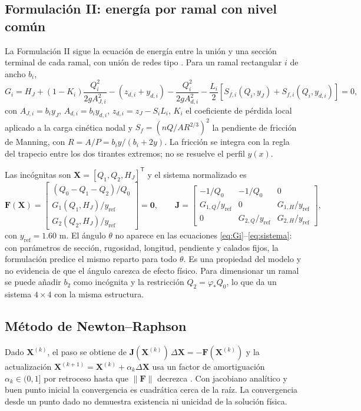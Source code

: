 \subsection{Formulación II: energía por ramal con nivel común}\label{sec:f2}
La Formulación II sigue la ecuación de energía entre la unión y una sección terminal de cada ramal, con unión de redes tipo \citet[cap.~6]{chaudhry2008}. Para un ramal rectangular $i$ de ancho $b_i$,
\begin{equation}
G_i=H_J+(1-K_i)\frac{Q_i^2}{2gA_{J,i}^2}-(z_{d,i}+y_{d,i})-\frac{Q_i^2}{2gA_{d,i}^2}-\frac{L_i}{2}\!\left[S_{f,i}(Q_i,y_J)+S_{f,i}(Q_i,y_{d,i})\right]=0,
\label{eq:Gi}
\end{equation}
con $A_{J,i}=b_iy_J$, $A_{d,i}=b_iy_{d,i}$, $z_{d,i}=z_J-S_iL_i$, $K_i$ el coeficiente de pérdida local aplicado a la carga cinética nodal y $S_f=\left(nQ/AR^{2/3}\right)^2$ la pendiente de fricción de Manning, con $R=A/P=b_iy/(b_i+2y)$. La fricción se integra con la regla del trapecio entre los dos tirantes extremos; no se resuelve el perfil $y(x)$.

Las incógnitas son $\mathbf X=[Q_1,Q_2,H_J]^{\mathsf T}$ y el sistema normalizado es
\begin{equation}
\mathbf F(\mathbf X)=\begin{bmatrix}(Q_0-Q_1-Q_2)/Q_0\\ G_1(Q_1,H_J)/y_{\mathrm{ref}}\\ G_2(Q_2,H_J)/y_{\mathrm{ref}}\end{bmatrix}=\mathbf 0,\qquad
\mathbf J=\begin{bmatrix}-1/Q_0&-1/Q_0&0\\ G_{1,Q}/y_{\mathrm{ref}}&0&G_{1,H}/y_{\mathrm{ref}}\\ 0&G_{2,Q}/y_{\mathrm{ref}}&G_{2,H}/y_{\mathrm{ref}}\end{bmatrix},
\label{eq:sistema}
\end{equation}
con $y_{\mathrm{ref}}=1.60$ m. El ángulo $\theta$ no aparece en las ecuaciones \eqref{eq:Gi}--\eqref{eq:sistema}: con parámetros de sección, rugosidad, longitud, pendiente y calados fijos, la formulación predice el mismo reparto para todo $\theta$. Es una propiedad del modelo y no evidencia de que el ángulo carezca de efecto físico. Para dimensionar un ramal se puede añadir $b_2$ como incógnita y la restricción $Q_2=\varphi_\ast Q_0$, lo que da un sistema $4\times4$ con la misma estructura.

\subsection{Método de Newton--Raphson}
Dado $\mathbf X^{(k)}$, el paso se obtiene de $\mathbf J(\mathbf X^{(k)})\,\Delta\mathbf X=-\mathbf F(\mathbf X^{(k)})$ y la actualización $\mathbf X^{(k+1)}=\mathbf X^{(k)}+\alpha_k\Delta\mathbf X$ usa un factor de amortiguación $\alpha_k\in(0,1]$ por retroceso hasta que $\|\mathbf F\|$ decrezca \citep{chapra2015}. Con jacobiano analítico y buen punto inicial la convergencia es cuadrática cerca de la raíz. La convergencia desde un punto dado no demuestra existencia ni unicidad de la solución física.

